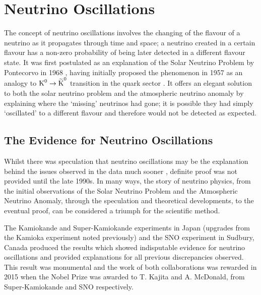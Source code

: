 \section{Neutrino Oscillations}\label{sec:NeutrinoOscillations}

The concept of neutrino oscillations involves the changing of the flavour of a neutrino as it propagates through time and space; a neutrino created in a certain flavour has a non-zero probability of being later detected in a different flavour state.  It was first postulated as an explanation of the Solar Neutrino Problem by Pontecorvo in 1968 \cite{Pontecorvo1968,Pontecorvo1969}, having initially proposed the phenomenon in 1957 as an analogy to $\textnormal{K}^0 \rightarrow \widetilde{\textnormal{K}}^0$ transition in the quark sector \cite{Pontecorvo1957}.  It offers an elegant solution to both the solar neutrino problem and the atmospheric neutrino anomaly by explaining where the `missing' neutrinos had gone; it is possible they had simply `oscillated' to a different flavour and therefore would not be detected as expected.

\subsection{The Evidence for Neutrino Oscillations}\label{sec:EvidenceNeutrinoOscillations}

Whilst there was speculation that neutrino oscillations may be the explanation behind the issues observed in the data much sooner \cite{Casper1991,BeckerSzendy1992}, definite proof was not provided until the late 1990s.  In many ways, the story of neutrino physics, from the initial observations of the Solar Neutrino Problem and the Atmospheric Neutrino Anomaly, through the speculation and theoretical developments, to the eventual proof, can be considered a triumph for the scientific method.

The Kamiokande and Super-Kamiokande experiments in Japan (upgrades from the Kamioka experiment noted previously) and the SNO experiment in Sudbury, Canada produced the results which showed indisputable evidence for neutrino oscillations and provided explanations for all previous discrepancies observed.  This result was monumental and the work of both collaborations was rewarded in 2015 when the Nobel Prize was awarded to T. Kajita and A. McDonald, from Super-Kamiokande and SNO respectively.

